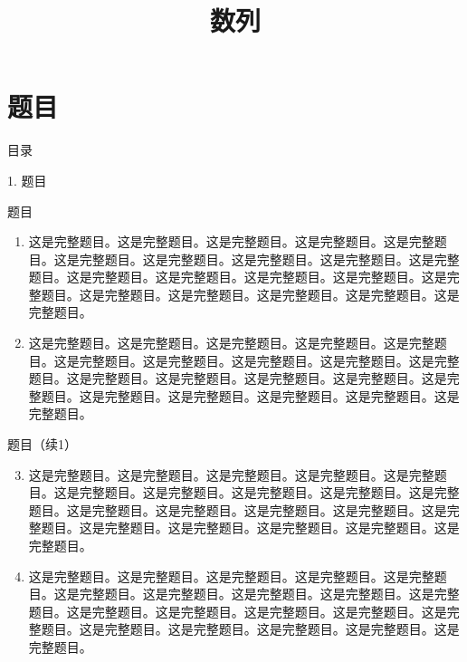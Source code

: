 \documentclass[aspectratio=169,10pt,fontset=fandol]{ctexbeamer}
\title{数列}
\begin{document}
\section{题目}
\begin{frame}[t,fragile]{目录}
\normalsize
{\color{blue}\normalsize 1. 题目\par}\vspace{0.22em}
\end{frame}
\begin{frame}[t,fragile]{题目}
\small
{\small
\begin{enumerate}\item 这是完整题目。这是完整题目。这是完整题目。这是完整题目。这是完整题目。这是完整题目。这是完整题目。这是完整题目。这是完整题目。这是完整题目。这是完整题目。这是完整题目。这是完整题目。这是完整题目。这是完整题目。这是完整题目。这是完整题目。这是完整题目。这是完整题目。这是完整题目。
\item 这是完整题目。这是完整题目。这是完整题目。这是完整题目。这是完整题目。这是完整题目。这是完整题目。这是完整题目。这是完整题目。这是完整题目。这是完整题目。这是完整题目。这是完整题目。这是完整题目。这是完整题目。这是完整题目。这是完整题目。这是完整题目。这是完整题目。这是完整题目。

\end{enumerate}
}
\end{frame}
\begin{frame}[t,fragile]{题目（续1）}
\small
{\small
\begin{enumerate}\setcounter{enumi}{2}
\item 这是完整题目。这是完整题目。这是完整题目。这是完整题目。这是完整题目。这是完整题目。这是完整题目。这是完整题目。这是完整题目。这是完整题目。这是完整题目。这是完整题目。这是完整题目。这是完整题目。这是完整题目。这是完整题目。这是完整题目。这是完整题目。这是完整题目。这是完整题目。
\item 这是完整题目。这是完整题目。这是完整题目。这是完整题目。这是完整题目。这是完整题目。这是完整题目。这是完整题目。这是完整题目。这是完整题目。这是完整题目。这是完整题目。这是完整题目。这是完整题目。这是完整题目。这是完整题目。这是完整题目。这是完整题目。这是完整题目。这是完整题目。

\end{enumerate}
}
\end{frame}
\end{document}
